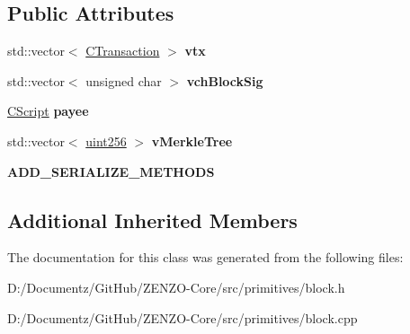 \subsection*{Public Attributes}
\begin{DoxyCompactItemize}
\item 
\mbox{\label{class_c_block_a9b6508d662722775f3029b980b382b66}} 
std\+::vector$<$ \mbox{\hyperlink{class_c_transaction}{C\+Transaction}} $>$ {\bfseries vtx}
\item 
\mbox{\label{class_c_block_a78f882e24c4416f42039cbc6a67faf6e}} 
std\+::vector$<$ unsigned char $>$ {\bfseries vch\+Block\+Sig}
\item 
\mbox{\label{class_c_block_a1604a6d25f313ab1bf4e3777a6cba948}} 
\mbox{\hyperlink{class_c_script}{C\+Script}} {\bfseries payee}
\item 
\mbox{\label{class_c_block_a019ae6579acd08974653d3f443dd398a}} 
std\+::vector$<$ \mbox{\hyperlink{classuint256}{uint256}} $>$ {\bfseries v\+Merkle\+Tree}
\item 
\mbox{\label{class_c_block_a53ba28b86cf6c5b1de640941786fa3b8}} 
{\bfseries A\+D\+D\+\_\+\+S\+E\+R\+I\+A\+L\+I\+Z\+E\+\_\+\+M\+E\+T\+H\+O\+DS}
\end{DoxyCompactItemize}
\subsection*{Additional Inherited Members}


The documentation for this class was generated from the following files\+:\begin{DoxyCompactItemize}
\item 
D\+:/\+Documentz/\+Git\+Hub/\+Z\+E\+N\+Z\+O-\/\+Core/src/primitives/block.\+h\item 
D\+:/\+Documentz/\+Git\+Hub/\+Z\+E\+N\+Z\+O-\/\+Core/src/primitives/block.\+cpp\end{DoxyCompactItemize}

